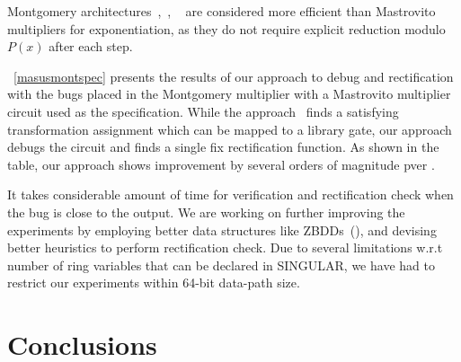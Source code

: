 Montgomery architectures~\cite{acar:1998},~\cite{wu:2002},
~\cite{knezevic:2008} are considered more efficient than Mastrovito multipliers for exponentiation, 
as they do not require explicit reduction modulo $P(x)$ after each step.

~\autoref{masusmontspec} presents the results of our approach to debug
and rectification with the bugs placed in the Montgomery multiplier
with a Mastrovito multiplier circuit used as the specification. While
the approach~\cite{fujita:2015} finds a satisfying transformation
assignment which can be mapped to a library gate, our approach debugs
the circuit and finds a single fix rectification function. As shown in
the table, our approach shows improvement by several orders of
magnitude pver \cite{fujita:2015}. 

It takes considerable amount of time for verification and
rectification check when the bug is close to the output. We are
working on further improving the experiments by employing better data
structures like  
ZBDDs~(\cite{minato:zbdd}), and devising better heuristics to perform
rectification check.
Due to several limitations w.r.t number of ring variables that can be
declared in SINGULAR, we have had to restrict our experiments within
64-bit data-path size.   

\section{Conclusions}

